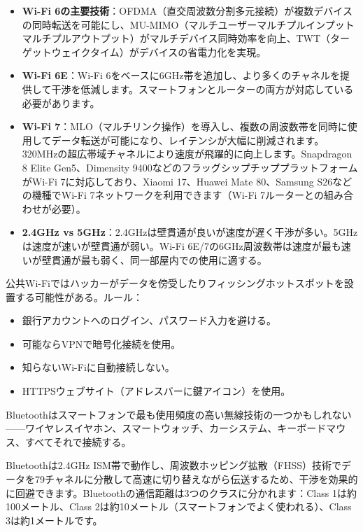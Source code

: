 \begin{itemize}
  \item \textbf{Wi-Fi 6の主要技術}：OFDMA（直交周波数分割多元接続）が複数デバイスの同時転送を可能にし、MU-MIMO（マルチユーザーマルチプルインプットマルチプルアウトプット）がマルチデバイス同時効率を向上、TWT（ターゲットウェイクタイム）がデバイスの省電力化を実現。
  \item \textbf{Wi-Fi 6E}：Wi-Fi 6をベースに6GHz帯を追加し、より多くのチャネルを提供して干渉を低減します。スマートフォンとルーターの両方が対応している必要があります。
  \item \textbf{Wi-Fi 7}：MLO（マルチリンク操作）を導入し、複数の周波数帯を同時に使用してデータ転送が可能になり、レイテンシが大幅に削減されます。320MHzの超広帯域チャネルにより速度が飛躍的に向上します。Snapdragon 8 Elite Gen5、Dimensity 9400などのフラッグシップチッププラットフォームがWi-Fi 7に対応しており、Xiaomi 17、Huawei Mate 80、Samsung S26などの機種でWi-Fi 7ネットワークを利用できます（Wi-Fi 7ルーターとの組み合わせが必要）。
  \item \textbf{2.4GHz vs 5GHz}：2.4GHzは壁貫通が良いが速度が遅く干渉が多い。5GHzは速度が速いが壁貫通が弱い。Wi-Fi 6E/7の6GHz周波数帯は速度が最も速いが壁貫通が最も弱く、同一部屋内での使用に適する。
\end{itemize}


公共Wi-Fiではハッカーがデータを傍受したりフィッシングホットスポットを設置する可能性がある。ルール：

\begin{itemize}
  \item 銀行アカウントへのログイン、パスワード入力を避ける。
  \item 可能ならVPNで暗号化接続を使用。
  \item 知らないWi-Fiに自動接続しない。
  \item HTTPSウェブサイト（アドレスバーに鍵アイコン）を使用。
\end{itemize}


Bluetoothはスマートフォンで最も使用頻度の高い無線技術の一つかもしれない——ワイヤレスイヤホン、スマートウォッチ、カーシステム、キーボードマウス、すべてそれで接続する。


Bluetoothは2.4GHz ISM帯で動作し、周波数ホッピング拡散（FHSS）技術でデータを79チャネルに分散して高速に切り替えながら伝送するため、干渉を効果的に回避できます。Bluetoothの通信距離は3つのクラスに分かれます：Class 1は約100メートル、Class 2は約10メートル（スマートフォンでよく使われる）、Class 3は約1メートルです。

